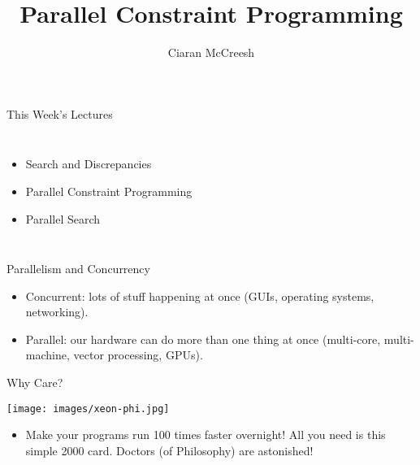 \documentclass{beamer}
\title{Parallel Constraint Programming}
\author[Ciaran McCreesh]{\textcolor{uofgblue}{Ciaran McCreesh}}
\begin{document}
{
    \begin{frame}
        \titlepage
    \end{frame}
}

\begin{frame}{This Week's Lectures}
    \begin{columns}
        \begin{itemize}
            \item Search and Discrepancies
            \item \textcolor{uofgblue}{Parallel Constraint Programming}
            \item Parallel Search
        \end{itemize}
    \end{columns}
\end{frame}

\begin{frame}{Parallelism and Concurrency}
    \begin{itemize}
        \item Concurrent: lots of stuff happening at once (GUIs, operating systems, networking).

        \item Parallel: our hardware can do more than one thing at once (multi-core, multi-machine,
            vector processing, GPUs).
    \end{itemize}
\end{frame}

\begin{frame}{Why Care?}
    \begin{center}
        \texttt{[image: images/xeon-phi.jpg]}
    \end{center}

    \begin{itemize}
        \item Make your programs run 100 times faster overnight! All you need is this simple
            \textsterling{}2000 card. Doctors (of Philosophy) are astonished!
    \end{itemize}
\end{frame}
\end{document}
